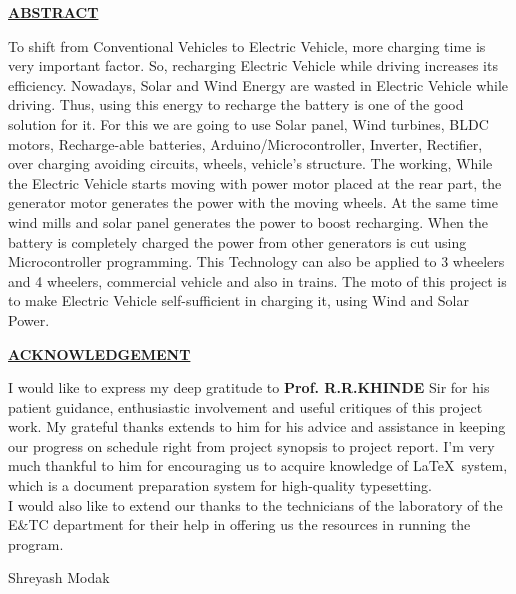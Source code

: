 \documentclass[a4paper,12pt]{article}
\begin{document}
\newpage
\begin{center}
\textbf{\LARGE\scshape\underline{ABSTRACT}}\\[2cm]
\end{center}
\large To shift from Conventional Vehicles to Electric Vehicle, more charging time
is very important factor. So, recharging Electric Vehicle while driving
increases its efficiency. Nowadays, Solar and Wind Energy are wasted in
Electric Vehicle while driving. Thus, using this energy to recharge the
battery is one of the good solution for it. For this we are going to use Solar
panel, Wind turbines, BLDC motors, Recharge-able batteries,
Arduino/Microcontroller, Inverter, Rectifier, over charging avoiding circuits,
wheels, vehicle’s structure. The working, While the Electric Vehicle starts
moving with power motor placed at the rear part, the generator motor
generates the power with the moving wheels. At the same time wind mills
and solar panel generates the power to boost recharging. When the battery is
completely charged the power from other generators is cut using
Microcontroller programming. This Technology can also be applied to 3
wheelers and 4 wheelers, commercial vehicle and also in trains. The moto of
this project is to make Electric Vehicle self-sufficient in charging it, using
Wind and Solar Power.

\newpage
\begin{center}
\textbf{\LARGE\scshape\underline{ACKNOWLEDGEMENT}}\\[2cm]
\end{center}
\large I would like to express my deep gratitude to \textbf{Prof. R.R.KHINDE} Sir for his  patient guidance, enthusiastic involvement and useful critiques of this project work. My grateful thanks extends to him for his advice and assistance in keeping our progress on schedule right from project synopsis to project report. I'm very much thankful to him for encouraging us to acquire knowledge of \LaTeX \ system, which is a document preparation system for high-quality typesetting.\\

\large I would also like to extend our thanks to the technicians of the laboratory of the E\&TC department for their help in offering us the resources in running the program.\\

\vspace{4cm}
\begin{flushright}
Shreyash Modak\\

\end{flushright}
\end{document}
